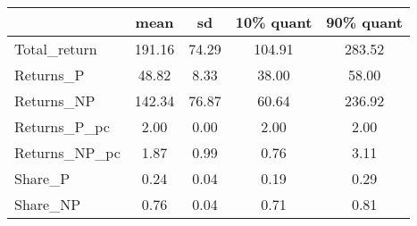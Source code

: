 \begin{tabular}{lcccc}
\toprule
{} &    mean &     sd &  10\% quant &  90\% quant \\
\midrule
Total\_return  &  191.16 &  74.29 &     104.91 &     283.52 \\
Returns\_P     &   48.82 &   8.33 &      38.00 &      58.00 \\
Returns\_NP    &  142.34 &  76.87 &      60.64 &     236.92 \\
Returns\_P\_pc  &    2.00 &   0.00 &       2.00 &       2.00 \\
Returns\_NP\_pc &    1.87 &   0.99 &       0.76 &       3.11 \\
Share\_P       &    0.24 &   0.04 &       0.19 &       0.29 \\
Share\_NP      &    0.76 &   0.04 &       0.71 &       0.81 \\
\bottomrule
\end{tabular}
